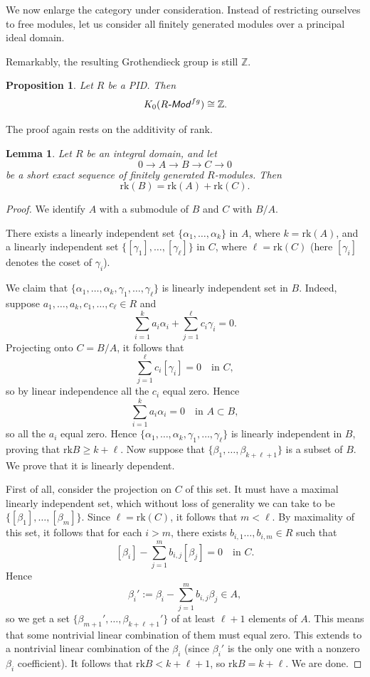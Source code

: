 \documentclass[12pt,reqno]{amsart}
\theoremstyle{plain}
\newtheorem{prop}[thm]{Proposition}
\numberwithin{equation}{section}
\newtheorem{lemma}{Lemma}
\begin{document}
We now enlarge the category under consideration. Instead of restricting ourselves to free modules, let us consider all finitely generated modules over a principal ideal domain.

Remarkably, the resulting Grothendieck group is still $\mathbb Z$.

\begin{prop}\label{prop: K0 for PID}
Let $R$ be a PID. Then
\[
K_0(R\textsf{\emph{-Mod}}^{fg})
\cong
\mathbb Z.
\]
\end{prop}

The proof again rests on the additivity of rank.

\begin{lemma}\label{lem: additivity of rank general}
Let $R$ be an integral domain, and let
\[
0\longrightarrow A\longrightarrow B\longrightarrow C\longrightarrow 0
\]
be a short exact sequence of finitely generated $R$-modules. Then
\[
\mathrm{rk}(B)=\mathrm{rk}(A)+\mathrm{rk}(C).
\]
\end{lemma}

\begin{proof}
We identify $A$ with a submodule of $B$ and $C$ with $B/A$.

There exists a linearly independent set $\{\alpha_1,\dots, \alpha_k\}$ in $A$, where $k=\mathrm{rk}(A)$, and a linearly independent set $\{[\gamma_1],\dots,[\gamma_\ell]\}$ in $C$, where $\ell = \mathrm{rk}(C)$ (here $[\gamma_i]$ denotes the coset of $\gamma_i$).

We claim that $\{\alpha_1,\dots,\alpha_k, \gamma_1,\dots, \gamma_\ell\}$ is linearly independent set in $B$. Indeed, suppose $a_1,\dots, a_k,c_1,\dots, c_\ell\in R$ and
\[\sum_{i=1}^k a_i\alpha_i + \sum_{j=1}^\ell c_i\gamma_i = 0.\]
Projecting onto $C = B/A$, it follows that
\[\sum_{j=1}^\ell c_i [\gamma_i] = 0\quad \text{in $C$},\]
so by linear independence all the $c_i$ equal zero. Hence
\[\sum_{i=1}^k a_i \alpha_i = 0 \quad \text{in $A\subset B$},\]
so all the $a_i$ equal zero. Hence $\{\alpha_1,\dots,\alpha_k, \gamma_1,\dots, \gamma_\ell\}$ is linearly independent in $B$, proving that $\mathrm{rk} B \ge k + \ell$. Now suppose that $\{\beta_1,\dots, \beta_{k+\ell+1}\}$ is a subset of $B$. We prove that it is linearly dependent. 

First of all, consider the projection on $C$ of this set. It must have a maximal linearly independent set, which without loss of generality we can take to be $\{[\beta_1],\dots,[\beta_m]\}$. Since $\ell = \mathrm{rk}(C)$, it follows that $m<\ell$. By maximality of this set, it follows that for each $i>m$, there exists $b_{i,1}\dots, b_{i,m}\in R$ such that
\[[\beta_i] - \sum_{j=1}^m b_{i,j}[\beta_j] = 0 \quad \text{in $C$}.\]
Hence
\[\beta_i' := \beta_i - \sum_{j=1}^m b_{i,j}\beta_j \in A,\]
so we get a set $\{\beta_{m+1}',\dots, \beta_{k+\ell+1}'\}$ of at least $\ell+1$ elements of $A$. This means that some nontrivial linear combination of them must equal zero. This extends to a nontrivial linear combination of the $\beta_i$ (since $\beta_i'$ is the only one with a nonzero $\beta_i$ coefficient). It follows that $\mathrm{rk} B< k+\ell +1$, so  $\mathrm{rk} B= k + \ell$. We are done.
\end{proof}
\end{document}
